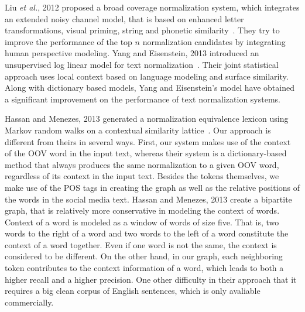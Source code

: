 \documentclass[a4paper,onesided,12pt]{report}
\begin{document}
Liu \textit{et al.}, 2012 proposed a broad coverage normalization system, which integrates an extended noisy channel model, that is based on enhanced letter transformations, visual priming, string and phonetic similarity~\cite{liu2012broad}. They try to improve the performance of the top $n$ normalization candidates by integrating human perspective modeling.
Yang and Eisenstein, 2013 introduced an unsupervised log linear model for text normalization~\cite{DBLP:conf/emnlp/YangE13}. Their joint statistical approach uses local context based on language modeling and surface similarity. Along with dictionary based models, Yang and Eisenstein's model have obtained a significant improvement on the performance of text normalization systems.

Hassan and Menezes, 2013 generated a normalization equivalence lexicon using Markov random walks on a contextual similarity lattice~\cite{DBLP:conf/acl/HassanM13}. Our approach is different from theirs in several ways. First, our system makes use of the context of the OOV word in the input text, whereas their system is a dictionary-based method that always produces the same normalization to a given OOV word, regardless of its context in the input text. Besides the tokens themselves, we make use of the POS tags in creating the graph as well as the relative positions of the words in the social media text. Hassan and Menezes, 2013 create a bipartite graph, that is relatively more conservative in modeling the context of words. Context of a word is modeled as a window of words of size five. That is, two words to the right of a word and two words to the left of a word constitute the context of a word together. Even if one word is not the same, the context is considered to be different. On the other hand, in our graph, each neighboring token contributes to the context information of a word, which leads to both a higher recall and a higher precision. One other difficulty in their approach that it requires a big clean corpus of English sentences, which is only avaliable commercially.


\end{document}
